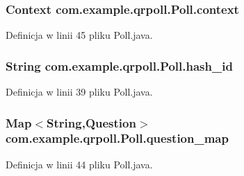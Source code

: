 \hypertarget{classcom_1_1example_1_1qrpoll_1_1_poll_a22159bb6ccaf5330c7691c47fcb0ea00}{
\subsubsection[{context}]{\setlength{\rightskip}{0pt plus 5cm}Context com.\+example.\+qrpoll.\+Poll.\+context\hspace{0.3cm}{\ttfamily [private]}}}\label{classcom_1_1example_1_1qrpoll_1_1_poll_a22159bb6ccaf5330c7691c47fcb0ea00}


Definicja w linii 45 pliku Poll.\+java.

\hypertarget{classcom_1_1example_1_1qrpoll_1_1_poll_acbb2a9859e39f1b1ce48e75c95eb3866}{
\subsubsection[{hash\+\_\+id}]{\setlength{\rightskip}{0pt plus 5cm}String com.\+example.\+qrpoll.\+Poll.\+hash\+\_\+id\hspace{0.3cm}{\ttfamily [private]}}}\label{classcom_1_1example_1_1qrpoll_1_1_poll_acbb2a9859e39f1b1ce48e75c95eb3866}


Definicja w linii 39 pliku Poll.\+java.

\hypertarget{classcom_1_1example_1_1qrpoll_1_1_poll_ac4019650bac8ecbf279808dc4d4dae9b}{
\subsubsection[{question\+\_\+map}]{\setlength{\rightskip}{0pt plus 5cm}Map$<$String,{\bf Question}$>$ com.\+example.\+qrpoll.\+Poll.\+question\+\_\+map\hspace{0.3cm}{\ttfamily [private]}}}\label{classcom_1_1example_1_1qrpoll_1_1_poll_ac4019650bac8ecbf279808dc4d4dae9b}


Definicja w linii 44 pliku Poll.\+java.

